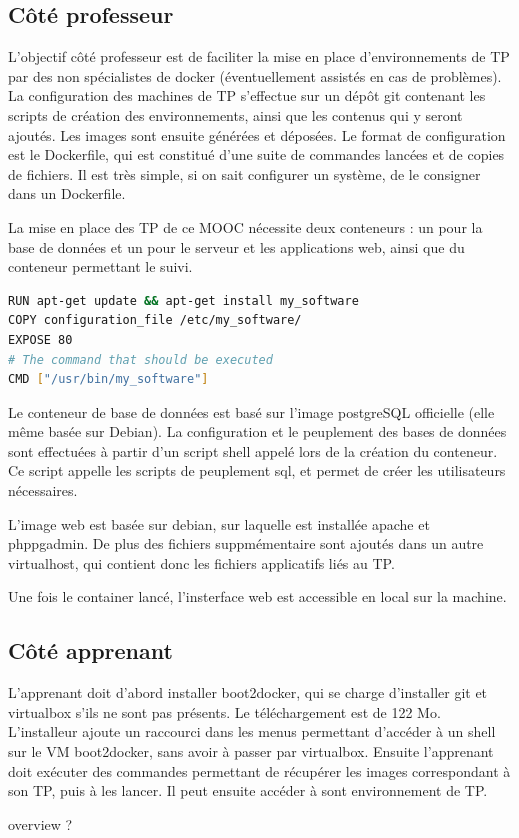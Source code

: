 \documentclass[a4paper,11pt]{report}
\begin{document}
\subsection{Côté professeur}

L'objectif côté professeur est de faciliter la mise en place d'environnements de TP par des non spécialistes de docker (éventuellement assistés en cas de problèmes).
La configuration des machines de TP s'effectue sur un dépôt git contenant les scripts de création des environnements, ainsi que les contenus qui y seront ajoutés. Les images sont ensuite générées et déposées.
Le format de configuration est le Dockerfile, qui est constitué d'une suite de commandes lancées et de copies de fichiers. Il est très simple, si on sait configurer un système, de le consigner dans un Dockerfile.

La mise en place des TP de ce MOOC nécessite deux conteneurs : un pour la base de données et un pour le serveur et les applications web, ainsi que du conteneur permettant le suivi.

\begin{lstlisting}[language=Bash,caption={Dockerfile de base}]
RUN apt-get update && apt-get install my_software
COPY configuration_file /etc/my_software/
EXPOSE 80
# The command that should be executed
CMD ["/usr/bin/my_software"]
\end{lstlisting}

Le conteneur de base de données est basé sur l'image postgreSQL officielle (elle même basée
sur Debian). La configuration et le peuplement des bases de données sont effectuées à partir d'un script shell appelé lors de la création du conteneur. Ce script appelle les scripts de peuplement sql, et permet de créer les utilisateurs nécessaires.

L'image web est basée sur debian, sur laquelle est installée apache et phppgadmin. De plus des fichiers suppmémentaire sont ajoutés dans un autre virtualhost, qui contient donc les fichiers applicatifs liés au TP.

Une fois le container lancé, l'insterface web est accessible en local sur la machine.

\subsection{Côté apprenant}

L'apprenant doit d'abord installer boot2docker, qui se charge d'installer git et virtualbox s'ils ne sont pas présents. Le téléchargement est de 122 Mo. L'installeur ajoute un raccourci dans les menus permettant d'accéder à un shell sur le VM boot2docker, sans avoir à passer par virtualbox. Ensuite l'apprenant doit exécuter des commandes permettant de récupérer les images correspondant à son TP, puis à les lancer. Il peut ensuite accéder à sont environnement de TP.


overview ?


\printbibliography
\end{document}
